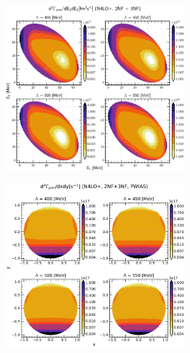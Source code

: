     \begin{figure}[h]
        \begin{center}
        \includegraphics[width=0.7\textwidth]{PlotData/PION/Dalitz_maps/figures/Dalitz_map_pnn_E1E2_cutofs.pdf}
        \end{center}
        \caption{}
        \label{pion_map_E1E2_cutoff}
    \end{figure}

    \begin{figure}[h]
        \begin{center}
        \includegraphics[width=0.7\textwidth]{PlotData/PION/Dalitz_maps/figures/Dalitz_map_pnn_xy_cutofs_PWIAS.pdf}
        \end{center}
        \caption{}
        \label{pion_map_xy_cutoff_PW}
    \end{figure}

